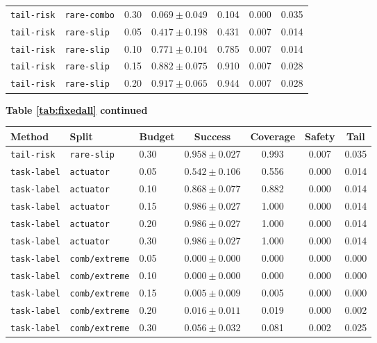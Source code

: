 \documentclass{article}
\begin{document}
\begin{center}
\begin{tabular}{lllcccc}
\texttt{tail-risk} & \texttt{rare-combo} & 0.30 & $0.069 \pm 0.049$ & 0.104 & 0.000 & 0.035 \\
\texttt{tail-risk} & \texttt{rare-slip} & 0.05 & $0.417 \pm 0.198$ & 0.431 & 0.007 & 0.014 \\
\texttt{tail-risk} & \texttt{rare-slip} & 0.10 & $0.771 \pm 0.104$ & 0.785 & 0.007 & 0.014 \\
\texttt{tail-risk} & \texttt{rare-slip} & 0.15 & $0.882 \pm 0.075$ & 0.910 & 0.007 & 0.028 \\
\texttt{tail-risk} & \texttt{rare-slip} & 0.20 & $0.917 \pm 0.065$ & 0.944 & 0.007 & 0.028 \\
\bottomrule
\end{tabular}
\end{center}
\begin{center}
\textbf{Table \ref{tab:fixedall} continued}\\[0.4ex]
\begin{tabular}{lllcccc}
\toprule
Method & Split & Budget & Success & Coverage & Safety & Tail \\
\midrule
\texttt{tail-risk} & \texttt{rare-slip} & 0.30 & $0.958 \pm 0.027$ & 0.993 & 0.007 & 0.035 \\
\texttt{task-label} & \texttt{actuator} & 0.05 & $0.542 \pm 0.106$ & 0.556 & 0.000 & 0.014 \\
\texttt{task-label} & \texttt{actuator} & 0.10 & $0.868 \pm 0.077$ & 0.882 & 0.000 & 0.014 \\
\texttt{task-label} & \texttt{actuator} & 0.15 & $0.986 \pm 0.027$ & 1.000 & 0.000 & 0.014 \\
\texttt{task-label} & \texttt{actuator} & 0.20 & $0.986 \pm 0.027$ & 1.000 & 0.000 & 0.014 \\
\texttt{task-label} & \texttt{actuator} & 0.30 & $0.986 \pm 0.027$ & 1.000 & 0.000 & 0.014 \\
\texttt{task-label} & \texttt{comb/extreme} & 0.05 & $0.000 \pm 0.000$ & 0.000 & 0.000 & 0.000 \\
\texttt{task-label} & \texttt{comb/extreme} & 0.10 & $0.000 \pm 0.000$ & 0.000 & 0.000 & 0.000 \\
\texttt{task-label} & \texttt{comb/extreme} & 0.15 & $0.005 \pm 0.009$ & 0.005 & 0.000 & 0.000 \\
\texttt{task-label} & \texttt{comb/extreme} & 0.20 & $0.016 \pm 0.011$ & 0.019 & 0.000 & 0.002 \\
\texttt{task-label} & \texttt{comb/extreme} & 0.30 & $0.056 \pm 0.032$ & 0.081 & 0.002 & 0.025 \\

\end{tabular}
\end{center}
\end{document}

